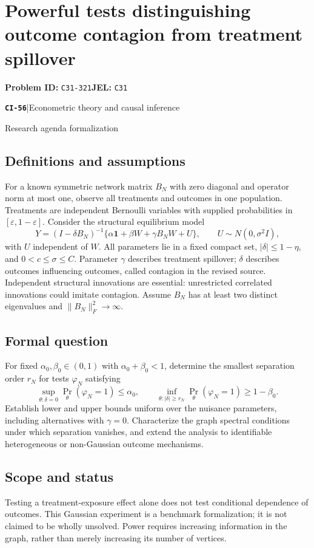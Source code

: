 \documentclass[11pt,a4paper]{article}
\newcommand{\entrymeta}[3]{{\sffamily\small\color{muted}\textbf{\texttt{#1}}\quad|\quad #2\par #3\par}}
\begin{document}
\section*{Powerful tests distinguishing outcome contagion from treatment spillover}
\textbf{Problem ID:} \texttt{C31-321}\quad \textbf{JEL:} \texttt{C31}\par
\label{problem:OP-0535}
\label{beyond:CI-56}
\entrymeta{CI-56}{Econometric theory and causal inference}{Research agenda formalization}
\subsection*{Definitions and assumptions}
For a known symmetric network matrix $B_N$ with zero diagonal and operator norm at most one, observe all treatments and outcomes in one population. Treatments are independent Bernoulli variables with supplied probabilities in $[\varepsilon,1-\varepsilon]$. Consider the structural equilibrium model
\[
 Y=(I-\delta B_N)^{-1}
       \{\alpha\mathbf1+\beta W+\gamma B_NW+U\},\qquad
 U\sim N(0,\sigma^2 I),
\]
with $U$ independent of $W$. All parameters lie in a fixed compact set, $|\delta|\leq1-\eta$, and $0<c\leq\sigma\leq C$. Parameter $\gamma$ describes treatment spillover; $\delta$ describes outcomes influencing outcomes, called contagion in the revised source. Independent structural innovations are essential: unrestricted correlated innovations could imitate contagion. Assume $B_N$ has at least two distinct eigenvalues and $\|B_N\|_F^2\to\infty$.
\subsection*{Formal question}
For fixed $\alpha_0,\beta_0\in(0,1)$ with $\alpha_0+\beta_0<1$, determine the smallest separation order $r_N$ for tests $\varphi_N$ satisfying
\[
 \sup_{\theta:\delta=0}\Pr_\theta(\varphi_N=1)\leq\alpha_0,\qquad
 \inf_{\theta:|\delta|\geq r_N}\Pr_\theta(\varphi_N=1)\geq1-\beta_0.
\]
Establish lower and upper bounds uniform over the nuisance parameters, including alternatives with $\gamma=0$. Characterize the graph spectral conditions under which separation vanishes, and extend the analysis to identifiable heterogeneous or non-Gaussian outcome mechanisms.
\subsection*{Scope and status}
Testing a treatment-exposure effect alone does not test conditional dependence of outcomes. This Gaussian experiment is a benchmark formalization; it is not claimed to be wholly unsolved. Power requires increasing information in the graph, rather than merely increasing its number of vertices.
\end{document}
